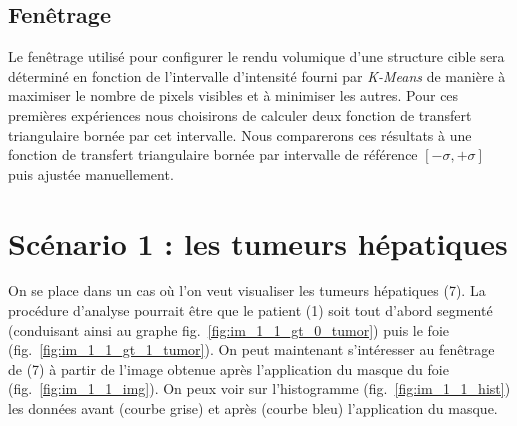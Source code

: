 \subsection{Fenêtrage}
	Le fenêtrage utilisé pour configurer le rendu volumique d'une structure cible sera déterminé en fonction de l'intervalle d'intensité fourni par \emph{K-Means} de manière à maximiser le nombre de pixels visibles et à minimiser les autres. Pour ces premières expériences nous choisirons de calculer deux fonction de transfert triangulaire bornée par cet intervalle. Nous comparerons ces résultats à une fonction de transfert triangulaire bornée par intervalle de référence $[-\sigma, +\sigma]$ puis ajustée manuellement.

	\section{Scénario 1 : les tumeurs hépatiques}

	On se place dans un cas où l'on veut visualiser les tumeurs hépatiques (7). La procédure d'analyse pourrait être que le patient (1) soit tout d'abord segmenté (conduisant ainsi au graphe fig.~\ref{fig:im_1_1_gt_0_tumor}) puis le foie (fig.~\ref{fig:im_1_1_gt_1_tumor}). On peut maintenant s'intéresser au fenêtrage de (7) à partir de l'image obtenue après l'application du masque du foie (fig.~\ref{fig:im_1_1_img}). On peux voir sur l'histogramme (fig.~\ref{fig:im_1_1_hist}) les données avant (courbe grise) et après (courbe bleu) l'application du masque.
	
